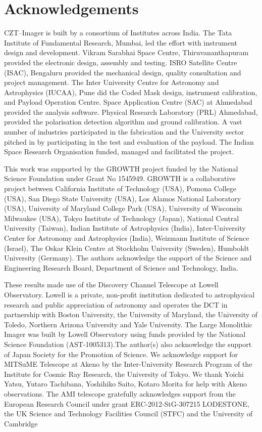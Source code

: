 \documentclass[twocolumn]{aastex6}
\begin{document}
\section*{Acknowledgements}

CZT--Imager is built by a consortium of Institutes across India. The Tata Institute of Fundamental Research, Mumbai, led the effort with instrument design and development. Vikram Sarabhai Space Centre, Thiruvananthapuram provided the electronic design, assembly and testing. ISRO Satellite Centre (ISAC), Bengaluru provided the mechanical design, quality consultation and project management. The Inter University Centre for Astronomy and Astrophysics (IUCAA), Pune did the Coded Mask design, instrument calibration, and Payload Operation Centre. Space Application Centre (SAC) at Ahmedabad provided the analysis software. Physical Research Laboratory (PRL) Ahmedabad, provided the polarisation detection algorithm and ground calibration. A vast number of industries participated in the fabrication and the University sector pitched in by participating in the test and evaluation of the payload.
The Indian Space Research Organisation funded, managed and facilitated the project.

This work was supported by the GROWTH project funded by the National Science Foundation under Grant No 1545949. GROWTH is a collaborative project between California Institute of Technology (USA), Pomona College (USA), San Diego State University (USA), Los Alamos National Laboratory (USA), University of Maryland College Park (USA), University of Wisconsin Milwaukee (USA), Tokyo Institute of Technology (Japan), National Central University (Taiwan), Indian Institute of Astrophysics (India), Inter-University Center for Astronomy and Astrophysics (India), Weizmann Institute of Science (Israel), The Oskar Klein Centre at Stockholm University (Sweden), Humboldt University (Germany). The authors acknowledge the support of the Science and Engineering Research Board, Department of Science and Technology, India. 

These results made use of the Discovery Channel Telescope at Lowell Observatory. Lowell is a private, non-profit institution dedicated to astrophysical research and public appreciation of astronomy and operates the DCT in partnership with Boston University, the University of Maryland, the University of Toledo, Northern Arizona University and Yale University.  The Large Monolithic Imager was built by Lowell Observatory using funds provided by the National Science Foundation (AST-1005313).The author(s) also acknowledge the support of Japan Society for the Promotion of Science. We acknowledge support for MITSuME Telescope at Akeno by the Inter-University Research Program of the Institute for Cosmic Ray Research, the University of Tokyo. We thank Yoichi Yatsu, Yutaro Tachibana, Yoshihiko Saito, Kotaro Morita for help with Akeno observations. The AMI telescope gratefully acknowledges support from the European Research Council under grant ERC-2012-StG-307215 LODESTONE, the UK Science and Technology Facilities Council (STFC) and the University of Cambridge
\end{document}
